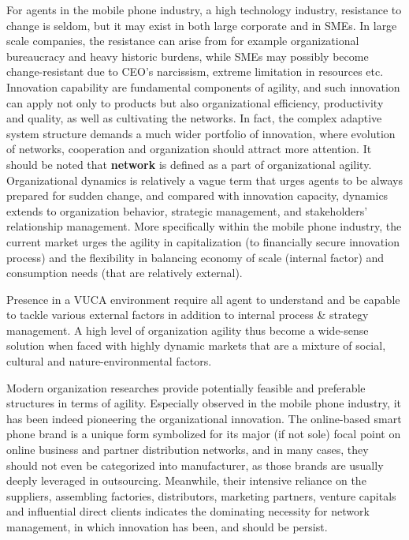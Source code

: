 \documentclass[utf8,english]{gradu3}
\begin{document}
For agents in the mobile phone industry, a high technology industry, resistance to change is seldom, but it may exist in both large corporate and in SMEs. In large scale companies, the resistance can arise from for example organizational bureaucracy and heavy historic burdens, while SMEs may possibly become change-resistant due to CEO's narcissism, extreme limitation in resources etc. Innovation capability are fundamental components of agility, and such innovation can apply not only to products but also organizational efficiency, productivity and quality, as well as cultivating the networks. In fact, the complex adaptive system structure demands a much wider portfolio of innovation, where evolution of networks, cooperation and organization should attract more attention. It should be noted that \textbf{network} is defined as a part of organizational agility. Organizational dynamics is relatively a vague term that urges agents to be always prepared for sudden change, and compared with innovation capacity, dynamics extends to organization behavior, strategic management, and stakeholders’ relationship management. More specifically within the mobile phone industry, the current market urges the agility in capitalization (to financially secure innovation process) and the flexibility in balancing economy of scale (internal factor) and consumption needs (that are relatively external).

Presence in a VUCA environment require all agent to understand and be capable to tackle various external factors in addition to internal process \& strategy management. A high level of organization agility thus become a wide-sense solution when faced with highly dynamic markets that are a mixture of social, cultural and nature-environmental factors.

Modern organization researches provide potentially feasible and preferable structures in terms of agility. Especially observed in the mobile phone industry, it has been indeed pioneering the organizational innovation. The online-based smart phone brand is a unique form symbolized for its major (if not sole) focal point on online business and partner distribution networks, and in many cases, they should not even be categorized into manufacturer, as those brands are usually deeply leveraged in outsourcing. Meanwhile, their intensive reliance on the suppliers, assembling factories, distributors, marketing partners, venture capitals and influential direct clients indicates the dominating necessity for network management, in which innovation has been, and should be persist.
\end{document}
